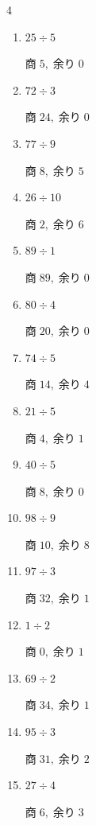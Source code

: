 \begin{multicols}{4}
\begin{enumerate}
  \item $25 \div 5$

        $商\; 5,\; 余り\; 0$

  \item $72 \div 3$

        $商\; 24,\; 余り\; 0$

  \item $77 \div 9$

        $商\; 8,\; 余り\; 5$

  \item $26 \div 10$

        $商\; 2,\; 余り\; 6$

  \item $89 \div 1$

        $商\; 89,\; 余り\; 0$

  \item $80 \div 4$

        $商\; 20,\; 余り\; 0$

\columnbreak %

  \item $74 \div 5$

        $商\; 14,\; 余り\; 4$

  \item $21 \div 5$

        $商\; 4,\; 余り\; 1$

  \item $40 \div 5$

        $商\; 8,\; 余り\; 0$

  \item $98 \div 9$

        $商\; 10,\; 余り\; 8$

  \item $97 \div 3$

        $商\; 32,\; 余り\; 1$

  \item $1 \div 2$

        $商\; 0,\; 余り\; 1$

  \item $69 \div 2$

        $商\; 34,\; 余り\; 1$

  \item $95 \div 3$

        $商\; 31,\; 余り\; 2$

  \item $27 \div 4$

        $商\; 6,\; 余り\; 3$


\end{enumerate}
\end{multicols}
